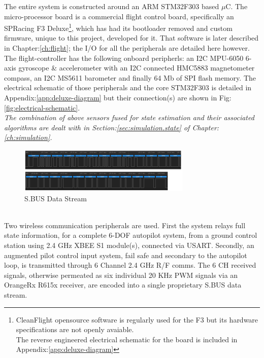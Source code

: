 The entire system is constructed around an ARM STM32F303\cite{stm32f303} based $\mu$C. The micro-processor board is a commercial flight control board, specifically an SPRacing F3 Deluxe\cite{spracing}\footnote{CleanFlight opensource software is regularly used for the F3 but its hardware specifications are not openly avaiable.\\The reverse engineered electrical schematic for the board is included in Appendix:\ref{app:deluxe-diagram}}, which has had its bootloader removed and custom firmware, unique to this project, developed for it. That software is later described in Chapter:\ref{ch:flight}; the I/O for all the peripherals are detailed here however. The flight-controller has the following onboard peripherls: an I2C MPU-6050\cite{mpu6050} 6-axis gyroscope \& accelerometer with an I2C connected HMC5883\cite{hmc5883} magnetometer compass, an I2C MS5611\cite{ms5611} barometer and finally 64 Mb of SPI flash memory. The electrical schematic of those peripherals and the core STM32F303 is detailed in Appendix:\ref{app:deluxe-diagram} but their connection(s) are shown in Fig:\ref{fig:electrical-schematic}. 
\\
\emph{\color{Gray} The combination of above sensors fused for state estimation and their associated algorithms are dealt with in Section:\ref{sec:simulation.state} of Chapter:\ref{ch:simulation}.}
\begin{figure}[hbtp]
\centering
\includegraphics[width=\textwidth]{figs/sbus}
\caption{S.BUS Data Stream}
\label{fig:sbus}
\end{figure}
\\
Two wireless communication peripherals are used. First the system relays full state information, for a complete 6-DOF autopilot system, from a ground control station using 2.4 GHz XBEE S1 module(s)\cite{xbees1}, connected via USART. Secondly, an augmented pilot control input system, fail safe and secondary to the autopilot loop, is transmitted through 6 Channel 2.4 GHz R/F comms. The 6 CH received signals, otherwise permeated as six individual 20 KHz PWM signals via an OrangeRx R615x\cite{r615x} receiver, are encoded into a single proprietary S.BUS data stream. 
